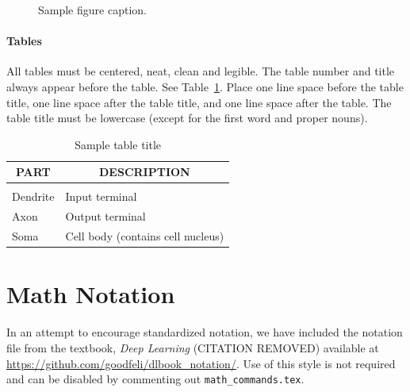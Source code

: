 \begin{figure}[ht]
\begin{center}
\fbox{\rule[-.5cm]{0cm}{4cm} \rule[-.5cm]{4cm}{0cm}}
\end{center}
\caption{Sample figure caption.}
\end{figure}

\paragraph{Tables}

All tables must be centered, neat, clean and legible. The table number and title always appear before the table. See Table~\ref{sample-table}. Place one line space before the table title, one line space after the table title, and one line space after the table. The table title must be lowercase (except for the first word and proper nouns).

\begin{table}[ht]
\caption{Sample table title}
\label{sample-table}
\begin{center}
\begin{tabular}{ll}
\multicolumn{1}{c}{\bf PART}  &\multicolumn{1}{c}{\bf DESCRIPTION}
\\ \hline \\
Dendrite         &Input terminal \\
Axon             &Output terminal \\
Soma             &Cell body (contains cell nucleus) \\
\end{tabular}
\end{center}
\end{table}

\section{Math Notation}

In an attempt to encourage standardized notation, we have included the
notation file from the textbook, \textit{Deep Learning}
(CITATION REMOVED) available at
\url{https://github.com/goodfeli/dlbook_notation/}.  Use of this style
is not required and can be disabled by commenting out
\texttt{math\_commands.tex}.
\clearpage

